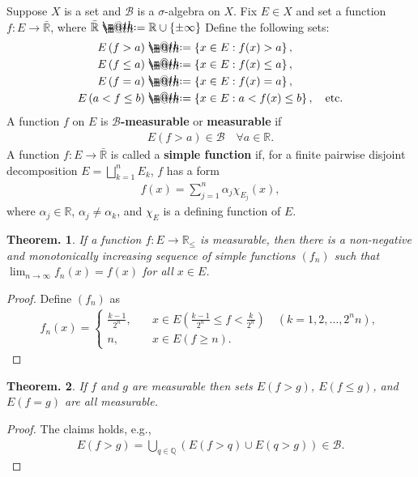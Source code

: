 \documentclass[openany, a4paper, oneside]{book}
\makeatletter
\newcommand*{\defeq}{\mathrel{\rlap{%
\raisebox{0.3ex}{$\m@th\cdot$}}%
\raisebox{-0.3ex}{$\m@th\cdot$}}%
=}
\theoremstyle{break}
\newtheorem{thm}{Theorem.}[section]
\theoremstyle{breakdefn}
\newcommand{\rbk}[1]{\left (#1\right)}
\newcommand{\cbk}[1]{\left\{#1\right\}}
\newcommand{\set}[2]{\left\{#1 : #2\right\}}
\newcommand{\bbQ}{\mathbb{Q}}
\newcommand{\bbR}{\mathbb{R}}
\newcommand{\bbRbar}{\bar{\mathbb{R}}}
\newcommand{\calB}{\mathcal{B}}
\makeatother
\begin{document}
Suppose $X$ is a set and $\calB$ is a $\sigma$-algebra on $X$.
Fix $E \in X$ and set a function $f \colon E \to \bbRbar$, where $\bbRbar \defeq \bbR \cup \cbk{\pm \infty}$
Define the following sets:
\begin{align}
 E \rbk{f > a}
 &\defeq
 \set{x \in E}{f (x) > a}, \\
 E \rbk{f \leq a}
 &\defeq
 \set{x \in E}{f (x) \leq a}, \\
 E \rbk{f = a}
 &\defeq
 \set{x \in E}{f (x) = a}, \\
 E \rbk{a < f \leq b}
 &\defeq
 \set{x \in E}{a < f (x) \leq b}, \quad \text{etc.}\\
\end{align}
A function $f$ on $E$ is \textbf{$\calB$-measurable} or \textbf{measurable} if
\begin{align}
 E \rbk{f > a} \in \calB \quad \forall a \in \bbR.
\end{align}
A function $f \colon E \to \bbRbar$ is called a \textbf{simple function} if,
for a finite pairwise disjoint decomposition $E = \bigsqcup_{k=1}^n E_k$, $f$ has a form
\begin{align}
 f (x)
 =
 \sum_{j=1}^n \alpha_j \chi_{E_j}(x),
\end{align}
where $\alpha_j \in \bbR$, $\alpha_j \neq \alpha_k$, and $\chi_{E}$ is a defining function of $E$.
\begin{thm}
 If a function $f \colon E \to \bbR_{\leq}$ is measurable,
 then there is a non-negative and  monotonically increasing sequence of simple functions $(f_n)$
 such that $\lim_{n \to \infty} f_n (x) = f (x)$ for all $x \in E$.
\end{thm}
\begin{proof}
Define $(f_n)$ as
\begin{align}
 f_n (x)
 =
 \begin{cases}
  \frac{k-1}{2^n}, \quad &x \in E\rbk{\frac{k-1}{2^n} \leq f < \frac{k}{2^n}} \quad (k = 1, 2, \dots, 2^n n), \\
  n, \quad &x \in E (f \geq n).
 \end{cases}
\end{align}
\end{proof}
\begin{thm}
 If $f$ and $g$ are measurable then sets $E (f > g)$, $E (f \leq g)$, and $E (f = g)$ are all measurable.
\end{thm}
\begin{proof}
The claims holds, e.g.,
\begin{align}
 E (f > g)
 =
 \bigcup_{q \in \bbQ} \rbk{E (f > q) \cup E (q > g)}
 \in
 \calB.
\end{align}
\end{proof}
\end{document}
